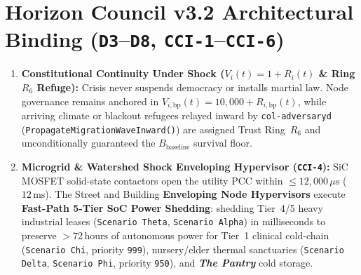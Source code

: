 \section{Horizon Council v3.2 Architectural Binding (\texttt{D3}--\texttt{D8}, \texttt{CCI-1}--\texttt{CCI-6})}
\begin{enumerate}
    \item \textbf{Constitutional Continuity Under Shock ($V_i(t) = 1 + R_i(t)$ \& Ring $R_6$ Refuge):} Crisis never suspends democracy or installs martial law. Node governance remains anchored in $V_{i,\mathrm{bp}}(t) = 10{,}000 + R_{i,\mathrm{bp}}(t)$, while arriving climate or blackout refugees relayed inward by \texttt{col-adversaryd} (\texttt{PropagateMigrationWaveInward()}) are assigned Trust Ring~$R_6$ and unconditionally guaranteed the $B_{\mathrm{baseline}}$ survival floor.
    \item \textbf{Microgrid \& Watershed Shock Enveloping Hypervisor (\texttt{CCI-4}):} SiC MOSFET solid-state contactors open the utility PCC within $\le 12{,}000\,\mu\mathrm{s}$ ($12\,\mathrm{ms}$). The Street and Building \textbf{Enveloping Node Hypervisors} execute \textbf{Fast-Path 5-Tier SoC Power Shedding}: shedding Tier~4/5 heavy industrial leases (\texttt{Scenario Theta}, \texttt{Scenario Alpha}) in milliseconds to preserve $>72\,\mathrm{hours}$ of autonomous power for Tier~1 clinical cold-chain (\texttt{Scenario Chi}, priority \texttt{999}), nursery/elder thermal sanctuaries (\texttt{Scenario Delta}, \texttt{Scenario Phi}, priority \texttt{950}), and \textbf{\textit{The Pantry}} cold storage.
\end{enumerate}

